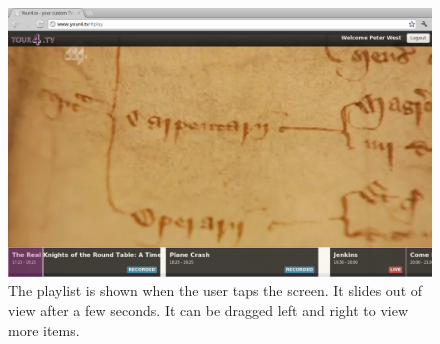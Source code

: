 \begin{figure}[th]
	\centering
	\includegraphics[width=\textwidth,height=0.5\textheight,keepaspectratio]{images/screenshots/your4-play.png}
	\caption{The playlist is shown when the user taps the screen. It slides out of view after a few seconds. It can be dragged left and right to view more items.}
	\label{fig:your4-play}
\end{figure}

